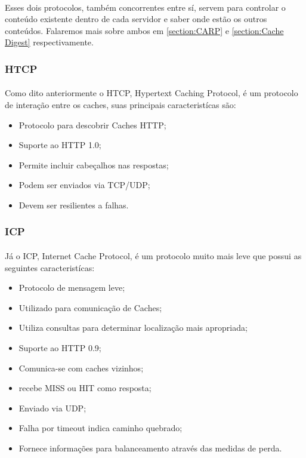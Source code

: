 \paragraph{} Esses dois protocolos, tamb\'em concorrentes entre s\'i, servem para controlar o conte\'udo existente dentro de cada servidor e saber onde est\~ao os outros conte\'udos. Falaremos mais sobre ambos em \ref{section:CARP} e \ref{section:Cache Digest} respectivamente.

\subsubsection{HTCP}
\label{section:HTCP}
\paragraph{} Como dito anteriormente o HTCP, Hypertext Caching Protocol, \'e um protocolo de intera\c{c}\~ao entre os caches, suas principais caracterist\'icas s\~ao:
\begin{itemize}
\item Protocolo para descobrir Caches HTTP;
\item Suporte ao HTTP 1.0;
\item Permite incluir cabeçalhos nas respostas;
\item Podem ser enviados via TCP/UDP;
\item Devem ser resilientes a falhas.
\end{itemize}

\subsubsection{ICP}
\label{section:ICP}
\paragraph{} J\'a o ICP, Internet Cache Protocol, \'e um protocolo muito mais leve que possui as seguintes caracterist\'icas:
\begin{itemize}
\item Protocolo de mensagem leve;
\item Utilizado para comunica\c{c}\~ao de Caches;
\item Utiliza consultas para determinar localiza\c{c}\~ao mais apropriada;
\item Suporte ao HTTP 0.9;
\item Comunica-se com caches vizinhos;
\item recebe MISS ou HIT como resposta;
\item Enviado via UDP;
\item Falha por timeout indica caminho quebrado;
\item Fornece informa\c{c}\~oes para balanceamento atrav\'es das medidas de perda.
\end{itemize}

